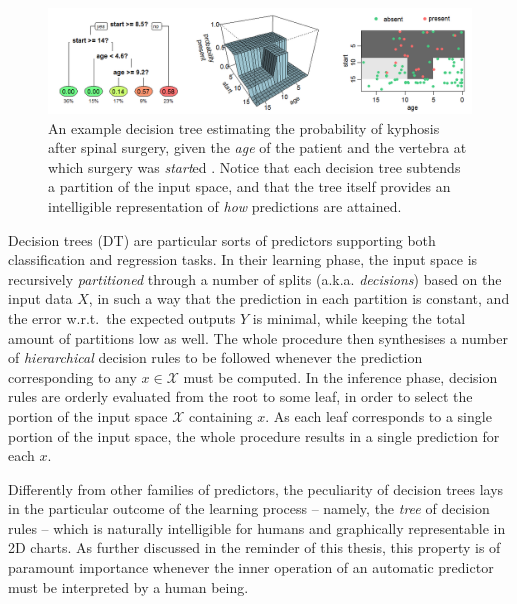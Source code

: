 \documentclass[12pt,a4paper,openright,twoside]{book}
\begin{document}
\begin{figure}
    \centering
    \includegraphics[width=\linewidth]{figures/dt-kyphosis.png}
    \caption{An example decision tree estimating the probability of kyphosis after spinal surgery, given the \emph{age} of the patient and the vertebra at which surgery was \emph{start}ed \cite{wiki:dt-learning}. Notice that each decision tree subtends a partition of the input space, and that the tree itself provides an intelligible representation of \emph{how} predictions are attained.}
    \label{fig:dt-example}
\end{figure}

Decision trees (DT) are particular sorts of predictors supporting both classification and regression tasks.
%
In their learning phase, the input space is recursively \emph{partitioned} through a number of splits (a.k.a. \emph{decisions}) based on the input data $X$, in such a way that the prediction in each partition is constant, and the error w.r.t.\ the expected outputs $Y$ is minimal, while keeping the total amount of partitions low as well.
%
The whole procedure then synthesises a number of \emph{hierarchical} decision rules to be followed whenever the prediction corresponding to any $x \in \mathcal{X}$ must be computed.
%
In the inference phase, decision rules are orderly evaluated from the root to some leaf, in order to select the portion of the input space  $\mathcal{X}$ containing $x$.
%
As each leaf corresponds to a single portion of the input space, the whole procedure results in a single prediction for each $x$.

Differently from other families of predictors, the peculiarity of decision trees lays in the particular outcome of the learning process -- namely, the \emph{tree} of decision rules -- which is naturally intelligible for humans and graphically representable in 2D charts.
%
As further discussed in the reminder of this thesis, this property is of paramount importance whenever the inner operation of an automatic predictor must be interpreted by a human being.
\end{document}
